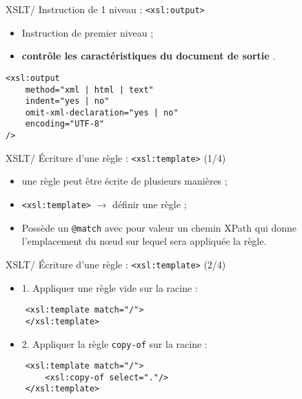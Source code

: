 \documentclass{beamer}
\begin{document}
    \begin{frame}[fragile]{XSLT/ Instruction de 1 niveau : \texttt{<xsl:output>}}
    \Large
        \begin{itemize}
            \item Instruction de premier niveau ;
            \item \og \textbf{contrôle les caractéristiques du document de sortie} \fg.
        \end{itemize}

        \begin{verbatim}
<xsl:output
    method="xml | html | text"
    indent="yes | no"
    omit-xml-declaration="yes | no"
    encoding="UTF-8"
/>
        \end{verbatim}
    \end{frame}

    \begin{frame}[fragile]{XSLT/ Écriture d'une règle : \texttt{<xsl:template>} (1/4)}
        \Large
        \begin{itemize}
            \item une règle peut être écrite de plusieurs manières ;
            \bigskip
            \item \texttt{<xsl:template>} $\rightarrow$ définir une règle ;
            \bigskip
            \item Possède un \texttt{@match} avec pour valeur un chemin XPath qui donne l'emplacement du n\oe ud sur lequel sera appliquée la règle.
        \end{itemize}
    \end{frame}

    \begin{frame}[fragile]{XSLT/ Écriture d'une règle : \texttt{<xsl:template>} (2/4)}
        \Large
        \begin{itemize}
            \item 1. Appliquer une règle vide sur la racine :
        \end{itemize}
        
        \begin{verbatim}
    <xsl:template match="/">
    </xsl:template>
        \end{verbatim}
        
        \begin{itemize}
            \item 2. Appliquer la règle \texttt{copy-of} sur la racine :
        \end{itemize}

        \begin{verbatim}
    <xsl:template match="/">
        <xsl:copy-of select="."/>
    </xsl:template>
        \end{verbatim}
    \end{frame}
\end{document}
